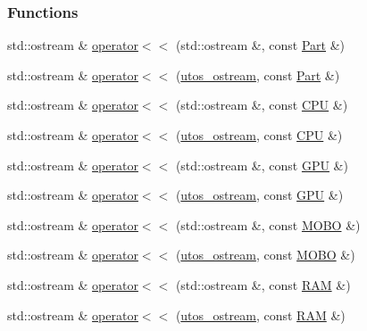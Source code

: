 \subsubsection*{Functions}
\begin{DoxyCompactItemize}
\item 
std\+::ostream \& \mbox{\hyperlink{_parts_8h_a41bf212a0001ee2061948fe863a2295b}{operator$<$$<$}} (std\+::ostream \&, const \mbox{\hyperlink{class_part}{Part}} \&)
\item 
std\+::ostream \& \mbox{\hyperlink{_parts_8h_a386ca228c4aa707c208d57d17150c7b4}{operator$<$$<$}} (\mbox{\hyperlink{structutos__ostream}{utos\+\_\+ostream}}, const \mbox{\hyperlink{class_part}{Part}} \&)
\item 
std\+::ostream \& \mbox{\hyperlink{_parts_8h_a63166a2a7d326683af5fc64dfaa7aa65}{operator$<$$<$}} (std\+::ostream \&, const \mbox{\hyperlink{class_c_p_u}{C\+PU}} \&)
\item 
std\+::ostream \& \mbox{\hyperlink{_parts_8h_acf2a8ceec2f59d545bb3775d65045fd2}{operator$<$$<$}} (\mbox{\hyperlink{structutos__ostream}{utos\+\_\+ostream}}, const \mbox{\hyperlink{class_c_p_u}{C\+PU}} \&)
\item 
std\+::ostream \& \mbox{\hyperlink{_parts_8h_a0de289ccec7d8750e588f0a5761252b0}{operator$<$$<$}} (std\+::ostream \&, const \mbox{\hyperlink{class_g_p_u}{G\+PU}} \&)
\item 
std\+::ostream \& \mbox{\hyperlink{_parts_8h_a78778b576ee140cb8a81c35d0abf9716}{operator$<$$<$}} (\mbox{\hyperlink{structutos__ostream}{utos\+\_\+ostream}}, const \mbox{\hyperlink{class_g_p_u}{G\+PU}} \&)
\item 
std\+::ostream \& \mbox{\hyperlink{_parts_8h_a3b7a2a4db5c057c863872d61e15867ca}{operator$<$$<$}} (std\+::ostream \&, const \mbox{\hyperlink{class_m_o_b_o}{M\+O\+BO}} \&)
\item 
std\+::ostream \& \mbox{\hyperlink{_parts_8h_ac2eced95444aa93aa7aa2e748a3809e2}{operator$<$$<$}} (\mbox{\hyperlink{structutos__ostream}{utos\+\_\+ostream}}, const \mbox{\hyperlink{class_m_o_b_o}{M\+O\+BO}} \&)
\item 
std\+::ostream \& \mbox{\hyperlink{_parts_8h_a119a3c9e22eaeee7ac8e0e0400429fe2}{operator$<$$<$}} (std\+::ostream \&, const \mbox{\hyperlink{class_r_a_m}{R\+AM}} \&)
\item 
std\+::ostream \& \mbox{\hyperlink{_parts_8h_a098f804bf78d9b26a127d31657434067}{operator$<$$<$}} (\mbox{\hyperlink{structutos__ostream}{utos\+\_\+ostream}}, const \mbox{\hyperlink{class_r_a_m}{R\+AM}} \&)
\item 

\end{DoxyCompactItemize}
